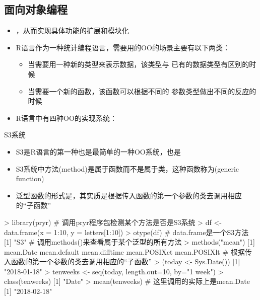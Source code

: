 \documentclass{beamerthemeMono}
\begin{document}
\subsection{面向对象编程}
\begin{frame}[t]{\subsecname}{}
\begin{itemize}
\item {}，从而实现具体功能的扩展和模块化
  \item R语言作为一种统计编程语言，需要用的OO的场景主要有以下两类：
  \begin{itemize}
     \item[\PencilLeftDown] 当需要用一种新的类型来表示数据，该类型与
   已有的数据类型有区别的时候
     \item[\PencilLeftDown] 当需要一个新的函数，该函数可以根据不同的
参数类型做出不同的反应的时候
  \end{itemize}
\item R语言中有四种OO的实现系统：
\end{itemize}  
\end{frame} 

\begin{frame}[t,fragile]{\subsecname}{S3系统}
  \begin{itemize}
  \item S3是R语言的第一种也是最简单的一种OO系统，也是
  \item S3系统中方法(method)是属于函数而不是属于类，这种函数称为(generic function)
  \item 泛型函数的形式是，其实质是根据传入函数的第一个参数的类去调用相应的“子函数”
  \end{itemize}  

\begin{rcode}
> library(pryr) # 调用pryr程序包检测某个方法是否是S3系统
> df <- data.frame(x = 1:10, y = letters[1:10])
> otype(df)    # data.frame是一个S3方法
[1] "S3"
# 调用methods()来查看属于某个泛型的所有方法
> methods("mean")
[1] mean.Date   mean.default    mean.difftime   mean.POSIXct    mean.POSIXlt
# 根据传入函数的第一个参数的类去调用相应的“子函数”
> (today <- Sys.Date())
[1] "2018-01-18"
> tenweeks <- seq(today, length.out=10, by="1 week")
> class(tenweeks)
[1] "Date"
> mean(tenweeks) # 这里调用的实际上是mean.Date
[1] "2018-02-18" 
\end{rcode}  
\end{frame}
\end{document}
